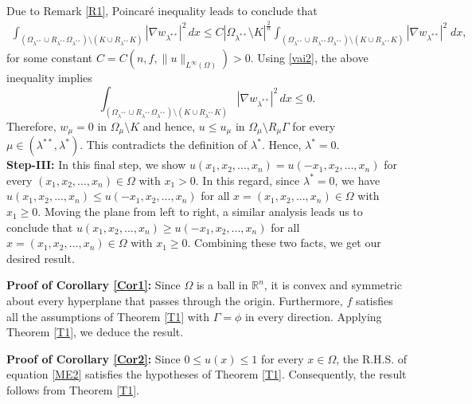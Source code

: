 \documentclass[11pt, notitlepage]{article}
\def\R{\mathbb{R}}
\begin{document}
{\begin{align}
\end{align}
Due to Remark \ref{R1}, Poincar\'{e} inequality leads to conclude that
\begin{align*}
     \int_{(\Omega_{\lambda^{**}}\cup R_{\lambda^{**}}\Omega_{\lambda^{**}})\setminus (K\cup R_{\lambda^{**}} K)}|\nabla w_{\lambda^{**}}|^2\,dx\leq C |\Omega_{\lambda^{**}}\setminus K|^\frac{2}{n}\int_{(\Omega_{\lambda^{**}}\cup R_{\lambda^{**}}\Omega_{\lambda^{**}})\setminus (K\cup R_{\lambda^{**}} K)}|\nabla w_{\lambda^{**}}|^2\;dx,
\end{align*}
for some constant $C=C(n,f,\|u\|_{L^\infty(\Omega)})>0$.
Using \eqref{vai2}, the above inequality implies 
$$\int_{(\Omega_{\lambda^{**}}\cup R_{\lambda^{**}}\Omega_{\lambda^{**}})\setminus (K\cup R_{\lambda^{**}} K)}|\nabla w_{\lambda^{**}}|^2\,dx\leq 0.$$
Therefore, $w_\mu=0$ in $\Omega_\mu\setminus K$ and hence, $u\leq u_\mu$ in $\Omega_\mu\setminus R_\mu\Gamma$ for every $\mu\in(\lambda^{**},\lambda^*)$. This contradicts the definition of $\lambda^*$. Hence, $\lambda^*=0$. \\
\textbf{Step-III:} In this final step, we show $u(x_1,x_2,...,x_n)=u(-x_1,x_2,...,x_n)$ for every $(x_1,x_2,...,x_n)\in\Omega$ with $x_1>0$. In this regard, since $\lambda^*=0$, we have $u(x_1,x_2,...,x_n)\leq u(-x_1,x_2,...,x_n)$ for all $x=(x_1,x_2,...,x_n)\in \Omega$ with $x_1\geq0$. Moving the plane from left to right, a similar analysis leads us to conclude that $u(x_1,x_2,...,x_n)\geq u(-x_1,x_2,...,x_n)$ for all $x=(x_1,x_2,...,x_n)\in \Omega$ with $x_1\geq0$. Combining these two facts, we get our desired result. 

\textbf{Proof of Corollary \ref{Cor1}:} Since $\Omega$ is a ball in $\R^n$, it is convex and symmetric about every hyperplane that passes through the origin. Furthermore, $f$ satisfies all the assumptions of Theorem \ref{T1} with $\Gamma=\phi$ in every direction. Applying Theorem \ref{T1}, we deduce the result.

\textbf{Proof of Corollary \ref{Cor2}:} Since $0\leq u(x)\leq 1$ for every $x\in\Omega$, the R.H.S. of equation \eqref{ME2} satisfies the hypotheses of Theorem \ref{T1}. Consequently, the result follows from Theorem \ref{T1}.
}
\end{document}
